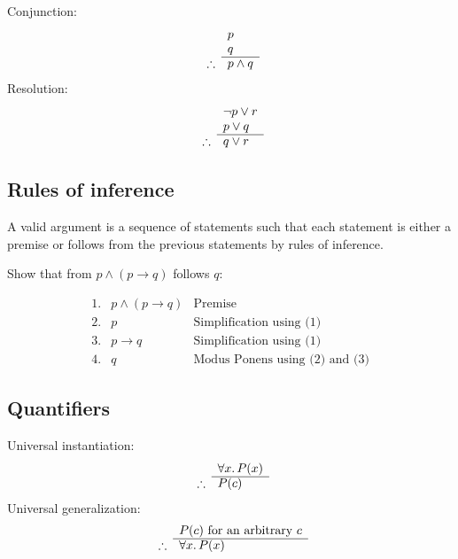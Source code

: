 Conjunction:
\begin{equation}
    \begin{array}{r l}
                   & p         \\
                   & q         \\
        \cline{2-2}
        \therefore & p \land q
    \end{array}
\end{equation}
Resolution:
\begin{equation}
    \begin{array}{r ll}
                   & \neg  p \lor r \\
                   & p \lor q       \\
        \cline{2-2}
        \therefore & q \lor r
    \end{array}
\end{equation}

\subsection{Rules of inference}
A valid argument is a sequence of statements such that each statement is either a premise or follows from the previous statements by rules of inference.

\begin{example}
    Show that from \(p \land (p \rightarrow q)\) follows \(q\):

    \begin{equation*}
        \begin{array}{rll}
            \text{1.} & p \land (p \rightarrow q) & \text{Premise}                        \\
            \text{2.} & p                         & \text{Simplification using (1)}       \\
            \text{3.} & p \rightarrow q           & \text{Simplification using (1)}       \\
            \text{4.} & q                         & \text{Modus Ponens using (2) and (3)}
        \end{array}
    \end{equation*}

\end{example}

\subsection{Quantifiers}
Universal instantiation:
\begin{equation}
    \begin{array}{r l}
                   & \forall x\ldotp P(x) \\
        \cline{2-2}
        \therefore & P(c)
    \end{array}
\end{equation}
Universal generalization:
\begin{equation}
    \begin{array}{r l}
                   & P(c) \text{ for an arbitrary } c \\
        \cline{2-2}
        \therefore & \forall x\ldotp P(x)
    \end{array}
\end{equation}

